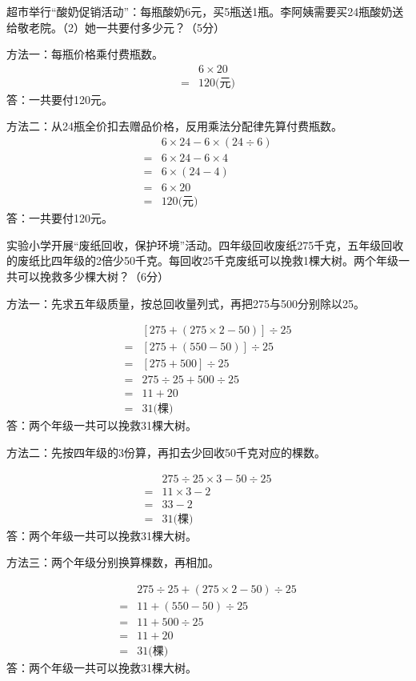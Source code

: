 超市举行“酸奶促销活动”：每瓶酸奶6元，买5瓶送1瓶。李阿姨需要买24瓶酸奶送给敬老院。（2）她一共要付多少元？（5分）\par
\begin{BookAnswer}
方法一：每瓶价格乘付费瓶数。\[\begin{aligned}&6\times20\\={}&120\text{(元)}\end{aligned}\]答：一共要付120元。\par 方法二：从24瓶全价扣去赠品价格，反用乘法分配律先算付费瓶数。\[\begin{aligned}&6\times24-6\times(24\div6)\\={}&6\times24-6\times4\\={}&6\times(24-4)\\={}&6\times20\\={}&120\text{(元)}\end{aligned}\]答：一共要付120元。
\end{BookAnswer}

实验小学开展“废纸回收，保护环境”活动。四年级回收废纸275千克，五年级回收的废纸比四年级的2倍少50千克。每回收25千克废纸可以挽救1棵大树。两个年级一共可以挽救多少棵大树？（6分）\par
\begin{BookAnswer}
方法一：先求五年级质量，按总回收量列式，再把275与500分别除以25。\par \[\begin{aligned}&[275+(275\times2-50)]\div25\\={}&[275+(550-50)]\div25\\={}&[275+500]\div25\\={}&275\div25+500\div25\\={}&11+20\\={}&31\text{(棵)}\end{aligned}\]答：两个年级一共可以挽救31棵大树。\par 方法二：先按四年级的3份算，再扣去少回收50千克对应的棵数。\par \[\begin{aligned}&275\div25\times3-50\div25\\={}&11\times3-2\\={}&33-2\\={}&31\text{(棵)}\end{aligned}\]答：两个年级一共可以挽救31棵大树。\par 方法三：两个年级分别换算棵数，再相加。\par \[\begin{aligned}&275\div25+(275\times2-50)\div25\\={}&11+(550-50)\div25\\={}&11+500\div25\\={}&11+20\\={}&31\text{(棵)}\end{aligned}\]答：两个年级一共可以挽救31棵大树。
\end{BookAnswer}

